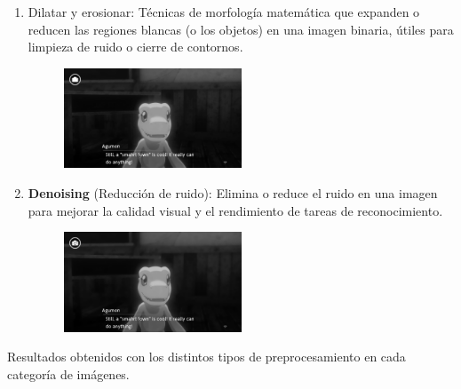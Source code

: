 \begin{enumerate}
	\item Dilatar y erosionar: 
	Técnicas de morfología matemática que expanden o reducen las regiones blancas (o los objetos) en una imagen binaria, útiles para limpieza de ruido o cierre de contornos.
		\begin{figure}[H]
		\centering
		\includegraphics[width = 0.5\textwidth]{Imagenes/Preprocesado/10.png}
	\end{figure}
	
	\item \textbf{Denoising} (Reducción de ruido): 
	Elimina o reduce el ruido en una imagen para mejorar la calidad visual y el rendimiento de tareas de reconocimiento.
		\begin{figure}[H]
		\centering
		\includegraphics[width = 0.5\textwidth]{Imagenes/Preprocesado/11.png}
	\end{figure}
	
\end{enumerate}
Resultados obtenidos con los distintos tipos de preprocesamiento en cada categoría de imágenes.
